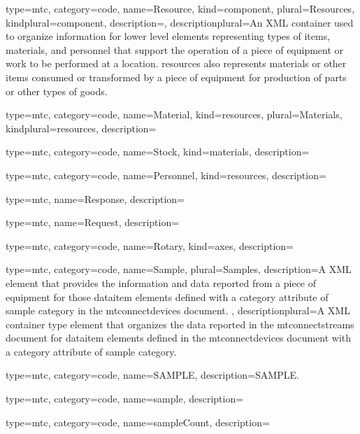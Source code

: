 {
  type=mtc,
  category=code,
  name={Resource},
  kind={component},
  plural={Resources},
  kindplural={component},
  description={},
  descriptionplural={An XML container used to organize information for \gls{lower level} elements representing types of items, materials, and personnel that support the operation of a piece of equipment or work to be performed at a location. \glspl{resource} also represents materials or other items consumed or transformed by a piece of equipment for production of parts or other types of goods.}
}


{
  type=mtc,
  category=code,
  name={Material},
  kind={resources},
  plural={Materials},
  kindplural={resources},
  description={}
}


{
  type=mtc,
  category=code,
  name={Stock},
  kind={materials},
  description={}
}


{
  type=mtc,
  category=code,
  name={Personnel},
  kind={resources},
  description={}
}


{
  type=mtc,
  name={Response},
  description={}
}


{
  type=mtc,
  name={Request},
  description={}
}


{
  type=mtc,
  category=code,
  name={Rotary},
  kind={axes},
  description={}
}


{
  type=mtc,
  category=code,
  name={Sample},
  plural={Samples},
  description={A XML element that provides the information and data reported from a piece of equipment for those \gls{dataitem} elements defined with a \gls{category} attribute of \gls{sample category} in the \glspl{mtconnectdevice} document. },
  descriptionplural={A XML container type element that organizes the data reported in the \glspl{mtconnectstream} document for \gls{dataitem} elements defined in the \glspl{mtconnectdevice} document with a \gls{category} attribute of \gls{sample category}.}
}


{
  type=mtc,
  category=code,
  name={SAMPLE},
  description={SAMPLE.}
}


{
  type=mtc,
  category=code,
  name={sample},
  description={}
}


{
  type=mtc,
  category=code,
  name={sampleCount},
  description={}
}



